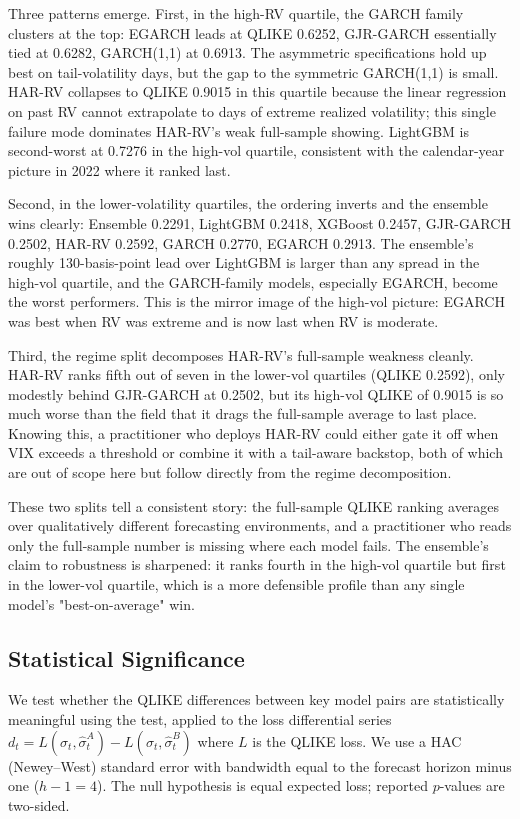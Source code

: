 Three patterns emerge. First, in the high-RV quartile, the GARCH family clusters at the top: EGARCH leads at QLIKE 0.6252, GJR-GARCH essentially tied at 0.6282, GARCH(1,1) at 0.6913. The asymmetric specifications hold up best on tail-volatility days, but the gap to the symmetric GARCH(1,1) is small. HAR-RV collapses to QLIKE 0.9015 in this quartile because the linear regression on past RV cannot extrapolate to days of extreme realized volatility; this single failure mode dominates HAR-RV's weak full-sample showing. LightGBM is second-worst at 0.7276 in the high-vol quartile, consistent with the calendar-year picture in 2022 where it ranked last.

Second, in the lower-volatility quartiles, the ordering inverts and the ensemble wins clearly: Ensemble 0.2291, LightGBM 0.2418, XGBoost 0.2457, GJR-GARCH 0.2502, HAR-RV 0.2592, GARCH 0.2770, EGARCH 0.2913. The ensemble's roughly 130-basis-point lead over LightGBM is larger than any spread in the high-vol quartile, and the GARCH-family models, especially EGARCH, become the worst performers. This is the mirror image of the high-vol picture: EGARCH was best when RV was extreme and is now last when RV is moderate.

Third, the regime split decomposes HAR-RV's full-sample weakness cleanly. HAR-RV ranks fifth out of seven in the lower-vol quartiles (QLIKE 0.2592), only modestly behind GJR-GARCH at 0.2502, but its high-vol QLIKE of 0.9015 is so much worse than the field that it drags the full-sample average to last place. Knowing this, a practitioner who deploys HAR-RV could either gate it off when VIX exceeds a threshold or combine it with a tail-aware backstop, both of which are out of scope here but follow directly from the regime decomposition.

These two splits tell a consistent story: the full-sample QLIKE ranking averages over qualitatively different forecasting environments, and a practitioner who reads only the full-sample number is missing where each model fails. The ensemble's claim to robustness is sharpened: it ranks fourth in the high-vol quartile but first in the lower-vol quartile, which is a more defensible profile than any single model's "best-on-average" win.

\subsection{Statistical Significance}

We test whether the QLIKE differences between key model pairs are statistically meaningful using the \citet{DieboldMariano1995} test, applied to the loss differential series $d_t = L(\sigma_t, \hat{\sigma}_t^A) - L(\sigma_t, \hat{\sigma}_t^B)$ where $L$ is the QLIKE loss. We use a HAC (Newey--West) standard error with bandwidth equal to the forecast horizon minus one ($h - 1 = 4$). The null hypothesis is equal expected loss; reported $p$-values are two-sided.

